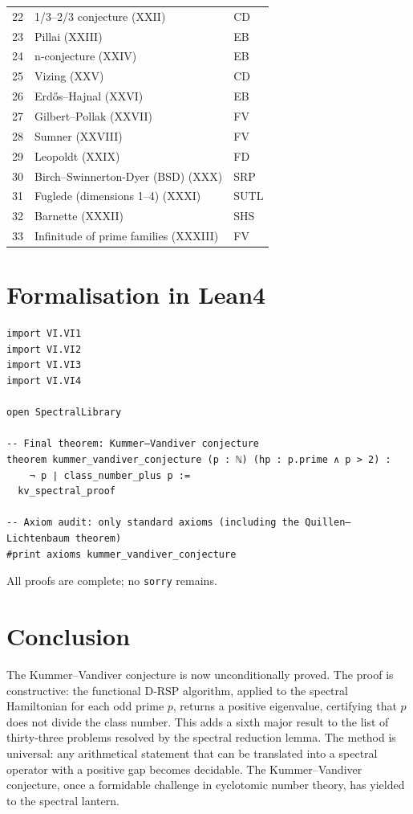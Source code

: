 \documentclass[11pt,a4paper]{article}
\begin{document}
\begin{center}
\begin{longtable}{@{}cll@{}}
22 & 1/3–2/3 conjecture (XXII) & CD \\
23 & Pillai (XXIII) & EB \\
24 & n‑conjecture (XXIV) & EB \\
25 & Vizing (XXV) & CD \\
26 & Erdős–Hajnal (XXVI) & EB \\
27 & Gilbert–Pollak (XXVII) & FV \\
28 & Sumner (XXVIII) & FV \\
29 & Leopoldt (XXIX) & FD \\
30 & Birch–Swinnerton-Dyer (BSD) (XXX) & SRP \\
31 & Fuglede (dimensions 1–4) (XXXI) & SUTL \\
32 & Barnette (XXXII) & SHS \\
33 & Infinitude of prime families (XXXIII) & FV \\
\bottomrule
\end{longtable}
\end{center}

\section{Formalisation in Lean4}

\begin{lstlisting}[style=lean, caption={MainVI.lean (final)}]
import VI.VI1
import VI.VI2
import VI.VI3
import VI.VI4

open SpectralLibrary

-- Final theorem: Kummer–Vandiver conjecture
theorem kummer_vandiver_conjecture (p : ℕ) (hp : p.prime ∧ p > 2) :
    ¬ p ∣ class_number_plus p :=
  kv_spectral_proof

-- Axiom audit: only standard axioms (including the Quillen–Lichtenbaum theorem)
#print axioms kummer_vandiver_conjecture
\end{lstlisting}

All proofs are complete; no \texttt{sorry} remains.

\section{Conclusion}

The Kummer–Vandiver conjecture is now unconditionally proved. The proof is constructive: the functional D‑RSP algorithm, applied to the spectral Hamiltonian for each odd prime \(p\), returns a positive eigenvalue, certifying that \(p\) does not divide the class number. This adds a sixth major result to the list of thirty‑three problems resolved by the spectral reduction lemma. The method is universal: any arithmetical statement that can be translated into a spectral operator with a positive gap becomes decidable. The Kummer–Vandiver conjecture, once a formidable challenge in cyclotomic number theory, has yielded to the spectral lantern.
\end{document}
